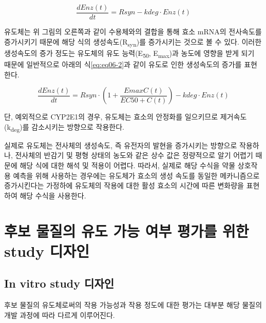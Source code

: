 \documentclass[
  11pt,
  krantz2, a4paper, twoside]{krantz}
\begin{document}
\begin{equation}
\frac{dEnz(t)}{dt} = R{syn} - k{deg} \cdot Enz(t)
\label{eq:eq06-1} 
\end{equation}

유도체는 위 그림의 오른쪽과 같이 수용체와의 결합을 통해 효소 mRNA의
전사속도를 증가시키기 때문에 해당 식의 생성속도(R\textsubscript{syn})를 증가시키는
것으로 볼 수 있다. 이러한 생성속도의 증가 정도는 유도체의 유도
능력(E\textsubscript{50}, E\textsubscript{max})과 농도에 영향을 받게 되기 때문에 일반적으로 아래의
식\eqref{eq:eq06-2}과 같이 유도로 인한 생성속도의 증가를 표현한다.

\begin{equation}
\frac{dEnz(t)}{dt} = R{syn} \cdot (1 + \frac{E{max}C(t)}{EC{50} + C(t)}) - k{deg} \cdot Enz(t)
\label{eq:eq06-2}
\end{equation}

단, 예외적으로 CYP2E1의 경우, 유도체는 효소의 안정화를 일으키므로
제거속도(k\textsubscript{deg})를 감소시키는 방향으로 작용한다.

실제로 유도체는 전사체의 생성속도, 즉 유전자의 발현을 증가시키는
방향으로 작용하나, 전사체의 반감기 및 평형 상태의 농도와 같은 상수 값은
정량적으로 알기 어렵기 때문에 해당 식에 대한 해석 및 적용이 어렵다.
따라서, 실제로 해당 수식을 약물 상호작용 예측을 위해 사용하는 경우에는
유도체가 효소의 생성 속도를 동일한 메카니즘으로 증가시킨다는 가정하에
유도체의 작용에 대한 활성 효소의 시간에 따른 변화량을 표현하여 해당
수식을 사용한다.

\section{후보 물질의 유도 가능 여부 평가를 위한 study 디자인}\label{uxd6c4uxbcf4-uxbb3cuxc9c8uxc758-uxc720uxb3c4-uxac00uxb2a5-uxc5ecuxbd80-uxd3c9uxac00uxb97c-uxc704uxd55c-study-uxb514uxc790uxc778}

\subsection{In vitro study 디자인}\label{in-vitro-study-uxb514uxc790uxc778}

후보 물질의 유도체로써의 작용 가능성과 작용 정도에 대한 평가는 대부분
해당 물질의 개발 과정에 따라 다르게 이루어진다.
\end{document}
